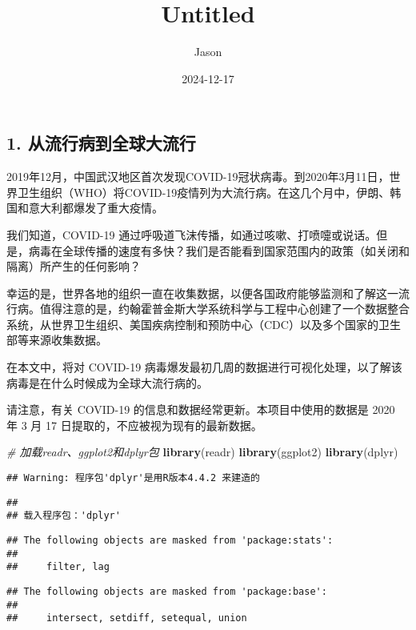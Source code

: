 \documentclass[
]{article}
\title{Untitled}
\author{Jason}
\date{2024-12-17}
\newenvironment{Shaded}{\begin{snugshade}}{\end{snugshade}}
\newcommand{\CommentTok}[1]{\textcolor[rgb]{0.56,0.35,0.01}{\textit{#1}}}
\newcommand{\FunctionTok}[1]{\textcolor[rgb]{0.13,0.29,0.53}{\textbf{#1}}}
\newcommand{\NormalTok}[1]{#1}
\begin{document}
\maketitle

\subsection{1.
从流行病到全球大流行}\label{ux4eceux6d41ux884cux75c5ux5230ux5168ux7403ux5927ux6d41ux884c}

2019年12月，中国武汉地区首次发现COVID-19冠状病毒。到2020年3月11日，世界卫生组织（WHO）将COVID-19疫情列为大流行病。在这几个月中，伊朗、韩国和意大利都爆发了重大疫情。

我们知道，COVID-19
通过呼吸道飞沫传播，如通过咳嗽、打喷嚏或说话。但是，病毒在全球传播的速度有多快？我们是否能看到国家范围内的政策（如关闭和隔离）所产生的任何影响？

幸运的是，世界各地的组织一直在收集数据，以便各国政府能够监测和了解这一流行病。值得注意的是，约翰霍普金斯大学系统科学与工程中心创建了一个数据整合系统，从世界卫生组织、美国疾病控制和预防中心（CDC）以及多个国家的卫生部等来源收集数据。

在本文中，将对 COVID-19
病毒爆发最初几周的数据进行可视化处理，以了解该病毒是在什么时候成为全球大流行病的。

请注意，有关 COVID-19 的信息和数据经常更新。本项目中使用的数据是 2020 年
3 月 17 日提取的，不应被视为现有的最新数据。

\begin{Shaded}
\begin{Highlighting}[]
\CommentTok{\# 加载readr、ggplot2和dplyr包}
\FunctionTok{library}\NormalTok{(readr)}
\FunctionTok{library}\NormalTok{(ggplot2)}
\FunctionTok{library}\NormalTok{(dplyr)}
\end{Highlighting}
\end{Shaded}

\begin{verbatim}
## Warning: 程序包'dplyr'是用R版本4.4.2 来建造的
\end{verbatim}

\begin{verbatim}
## 
## 载入程序包：'dplyr'
\end{verbatim}

\begin{verbatim}
## The following objects are masked from 'package:stats':
## 
##     filter, lag
\end{verbatim}

\begin{verbatim}
## The following objects are masked from 'package:base':
## 
##     intersect, setdiff, setequal, union
\end{verbatim}
\end{document}
